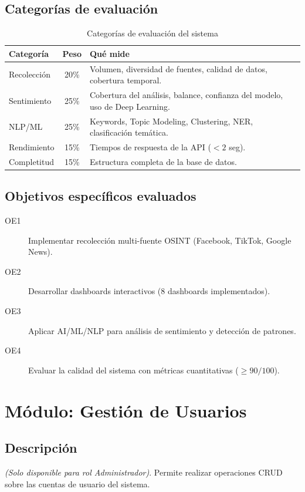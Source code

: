 \documentclass[12pt,a4paper]{article}
\begin{document}
\subsection{Categorías de evaluación}
\begin{table}[H]
\centering
\begin{tabularx}{\textwidth}{l c X}
\toprule
\textbf{Categoría} & \textbf{Peso} & \textbf{Qué mide} \\
\midrule
Recolección & 20\% & Volumen, diversidad de fuentes, calidad de datos, cobertura temporal. \\
Sentimiento & 25\% & Cobertura del análisis, balance, confianza del modelo, uso de Deep Learning. \\
NLP/ML & 25\% & Keywords, Topic Modeling, Clustering, NER, clasificación temática. \\
Rendimiento & 15\% & Tiempos de respuesta de la API ($<2$ seg). \\
Completitud & 15\% & Estructura completa de la base de datos. \\
\bottomrule
\end{tabularx}
\caption{Categorías de evaluación del sistema}
\end{table}

\subsection{Objetivos específicos evaluados}
\begin{description}
  \item[OE1] Implementar recolección multi-fuente OSINT (Facebook, TikTok, Google News).
  \item[OE2] Desarrollar dashboards interactivos (8 dashboards implementados).
  \item[OE3] Aplicar AI/ML/NLP para análisis de sentimiento y detección de patrones.
  \item[OE4] Evaluar la calidad del sistema con métricas cuantitativas ($\geq 90/100$).
\end{description}

\section{Módulo: Gestión de Usuarios}

\subsection{Descripción}
\textit{(Solo disponible para rol Administrador)}. Permite realizar operaciones CRUD sobre las cuentas de usuario del sistema.
\end{document}
